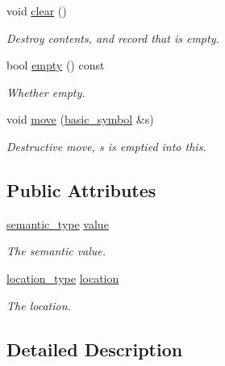 \begin{DoxyCompactItemize}
void \hyperlink{structyy_1_1genesyspp__parser_1_1basic__symbol_a307cece0deecd34ac5f4812a92d69d0b}{clear} ()
\begin{DoxyCompactList}\small\item\em Destroy contents, and record that is empty. \end{DoxyCompactList}\item 
bool \hyperlink{structyy_1_1genesyspp__parser_1_1basic__symbol_af31a4325622f49b9903cdc6734e4f9d8}{empty} () const 
\begin{DoxyCompactList}\small\item\em Whether empty. \end{DoxyCompactList}\item 
void \hyperlink{structyy_1_1genesyspp__parser_1_1basic__symbol_a4244f8c6794d7869a9e82a96cd49e5f2}{move} (\hyperlink{structyy_1_1genesyspp__parser_1_1basic__symbol}{basic\-\_\-symbol} \&s)
\begin{DoxyCompactList}\small\item\em Destructive move, {\itshape s} is emptied into this. \end{DoxyCompactList}\end{DoxyCompactItemize}
\subsection*{Public Attributes}
\begin{DoxyCompactItemize}
\item 
\hyperlink{classyy_1_1genesyspp__parser_a592978b9aaaa0d61f9faf4093f5f554d}{semantic\-\_\-type} \hyperlink{structyy_1_1genesyspp__parser_1_1basic__symbol_a66fa4a750b9ae7e8be9c640b8712fe0b}{value}
\begin{DoxyCompactList}\small\item\em The semantic value. \end{DoxyCompactList}\item 
\hyperlink{classyy_1_1genesyspp__parser_aa0276d3782ebff157827ad5e7d44f97c}{location\-\_\-type} \hyperlink{structyy_1_1genesyspp__parser_1_1basic__symbol_ae95666bbb377d80e31b8a676aa44e84a}{location}
\begin{DoxyCompactList}\small\item\em The location. \end{DoxyCompactList}\end{DoxyCompactItemize}


\subsection{Detailed Description}
